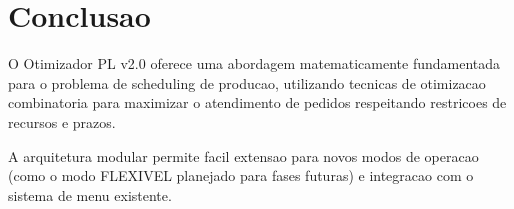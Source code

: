 \documentclass[12pt,a4paper]{article}
\begin{document}
\section{Conclusao}

O Otimizador PL v2.0 oferece uma abordagem matematicamente fundamentada para o problema de scheduling de producao, utilizando tecnicas de otimizacao combinatoria para maximizar o atendimento de pedidos respeitando restricoes de recursos e prazos.

A arquitetura modular permite facil extensao para novos modos de operacao (como o modo FLEXIVEL planejado para fases futuras) e integracao com o sistema de menu existente.
\end{document}

